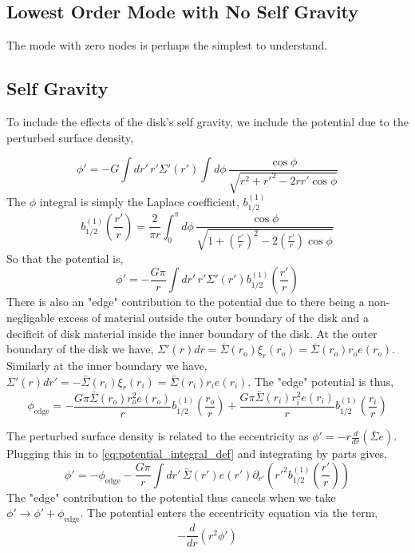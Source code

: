 \documentclass[apj]{emulateapj}
\begin{document}
\subsection{Lowest Order Mode with No Self Gravity}
The mode with zero nodes is perhaps the simplest to understand. 




\subsection{Self Gravity}

To include the effects of the disk's self gravity, we include the potential due to the perturbed surface density,

\begin{equation}
\phi' = - G \int dr' \, r' \Sigma'(r') \int d\phi \, \frac{\cos \phi}{\sqrt{ r^2 + r'^2 - 2 r r' \cos \phi}}
\end{equation}
The $\phi$ integral is simply the Laplace coefficient, $b_{1/2}^{(1)}$
\begin{equation}
b_{1/2}^{(1)} \left( \frac{ r'}{r} \right) = \frac{2}{\pi r} \int_0^\pi d\phi \,  \frac{\cos \phi}{\sqrt{1 + \left( \frac{r'}{r} \right)^2  - 2{\left( \frac{r'}{r} \right) \cos \phi}}}
\end{equation}
So that the potential is, 
\begin{equation} \label{eq:potential_integral_def}
\phi' = - \frac{ G \pi}{r} \int dr' \, r' \Sigma'(r') b_{1/2}^{(1)} \left( \frac{r'}{r} \right)
\end{equation}
There is also an "edge" contribution to the potential due to there being a non-negligable excess of material outside the outer boundary of the disk and a decificit of disk material inside the inner boundary of the disk. At the outer boundary of the disk we have, $\Sigma'(r) dr = \bar{\Sigma}(r_o) \xi_r(r_o) = \bar{\Sigma}(r_o) r_o e(r_o)$. Similarly at the inner boundary we have, $\Sigma'(r) dr' = - \bar{\Sigma}(r_i) \xi_r(r_i) = \bar{\Sigma}(r_i) r_i e(r_i)$. The "edge" potential is thus, 
\begin{equation}
\phi_\text{edge} = - \frac{G\pi \bar{\Sigma}(r_o) r_o^2 e(r_o)}{r}   b_{1/2}^{(1)} \left( \frac{r_o}{r} \right)  + \frac{G\pi \bar{\Sigma}(r_i) r_i^2 e(r_i)}{r}   b_{1/2}^{(1)} \left( \frac{r_i}{r} \right)
\end{equation}


The perturbed surface density is related to the eccentricity as $\phi' = - r \frac{d}{dr} \left( \bar{\Sigma} e \right)$. Plugging this in to \eqref{eq:potential_integral_def} and integrating by parts gives, 
\begin{equation}
\phi' = -\phi_\text{edge} - \frac{G \pi}{r} \int dr' \,  \bar{\Sigma}(r') e(r') \partial_{r'} \left( r'^2 b_{1/2}^{(1)} \left( \frac{r'}{r} \right) \right)
\end{equation}
The "edge" contribution to the potential thus cancels when we take $\phi' \rightarrow \phi' + \phi_\text{edge}$. The potential enters the eccentricity equation via the term,
\begin{equation}
- \frac{d}{dr} \left( r^2 \phi' \right)
\end{equation}
\end{document}

